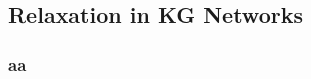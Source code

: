 \documentclass[12pt, dvipdfmx]{beamer}
\begin{document}
\subsection{Relaxation in KG Networks}
\begin{frame}
	\frametitle{
		aa
	}

	

\end{frame}
\end{document}

